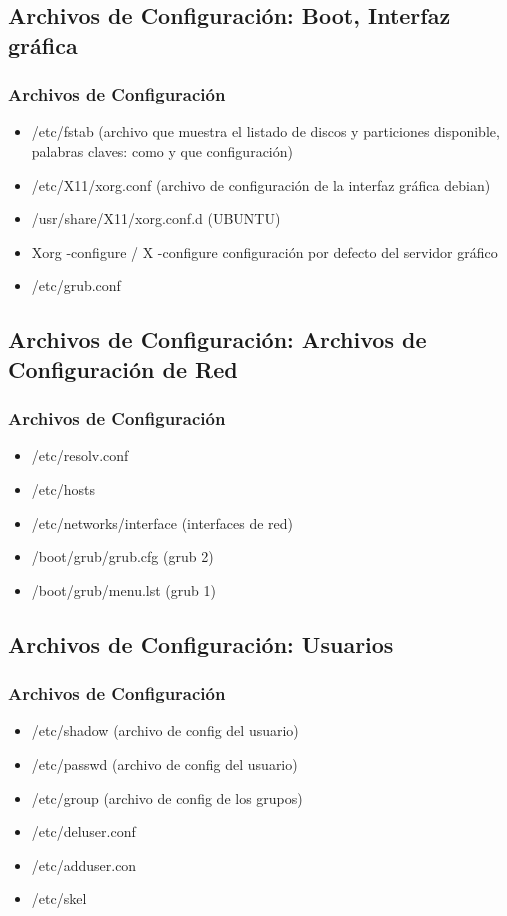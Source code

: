 \documentclass{beamer}
\begin{document}
\subsection{Archivos de Configuraci\'on: Boot, Interfaz gráfica}
\begin{frame}
\frametitle{Archivos de Configuraci\'on}
\begin{itemize}
	\item /etc/fstab (archivo que muestra el listado de discos y particiones disponible, palabras claves: como y que configuraci\'on)
	\item /etc/X11/xorg.conf (archivo de configuraci\'on de la interfaz gr\'afica debian)
	\item /usr/share/X11/xorg.conf.d (UBUNTU)
	\item Xorg -configure / X -configure configuraci\'on por defecto del servidor gr\'afico
	\item /etc/grub.conf
\end{itemize}
\end{frame}

\subsection{Archivos de Configuraci\'on: Archivos de Configuración de Red}
\begin{frame}
\frametitle{Archivos de Configuraci\'on}
\begin{itemize}
	\item /etc/resolv.conf
	\item /etc/hosts
	\item /etc/networks/interface (interfaces de red)
	\item /boot/grub/grub.cfg (grub 2)
	\item /boot/grub/menu.lst (grub 1)
\end{itemize}
\end{frame}

\subsection{Archivos de Configuraci\'on: Usuarios}
\begin{frame}
\frametitle{Archivos de Configuraci\'on}
\begin{itemize}
	\item /etc/shadow (archivo de config del usuario)
	\item /etc/passwd (archivo de config del usuario)
	\item /etc/group (archivo de config de los grupos)
	\item /etc/deluser.conf 
	\item /etc/adduser.con 
	\item /etc/skel
\end{itemize}
\end{frame}
\end{document}

